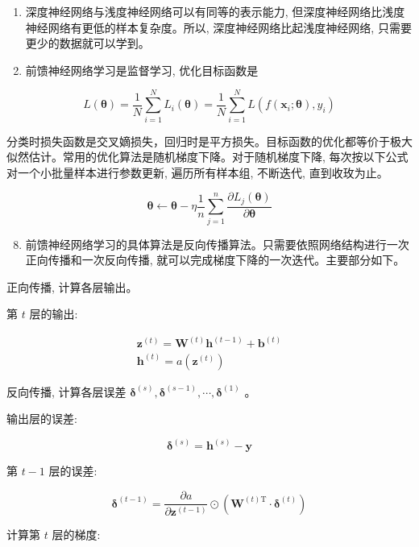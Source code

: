\documentclass[10pt]{article}
\begin{document}
\begin{CJK*}{UTF8}{bsmi}
\begin{enumerate}
  \item 深度神经网络与浅度神经网络可以有同等的表示能力, 但深度神经网络比浅度神经网络有更低的样本复杂度。所以, 深度神经网络比起浅度神经网络, 只需要更少的数据就可以学到。

  \item 前馈神经网络学习是监督学习, 优化目标函数是

\end{enumerate}

$$
L(\boldsymbol{\theta})=\frac{1}{N} \sum_{i=1}^{N} L_{i}(\boldsymbol{\theta})=\frac{1}{N} \sum_{i=1}^{N} L\left(f\left(\boldsymbol{x}_{i} ; \boldsymbol{\theta}\right), y_{i}\right)
$$

分类时损失函数是交叉嫡损失，回归时是平方损失。目标函数的优化都等价于极大似然估计。常用的优化算法是随机梯度下降。对于随机梯度下降, 每次按以下公式对一个小批量样本进行参数更新, 遍历所有样本组, 不断迭代, 直到收玫为止。

$$
\boldsymbol{\theta} \leftarrow \boldsymbol{\theta}-\eta \frac{1}{n} \sum_{j=1}^{n} \frac{\partial L_{j}(\boldsymbol{\theta})}{\partial \boldsymbol{\theta}}
$$

\begin{enumerate}
  \setcounter{enumi}{7}
  \item 前馈神经网络学习的具体算法是反向传播算法。只需要依照网络结构进行一次正向传播和一次反向传播, 就可以完成梯度下降的一次迭代。主要部分如下。
\end{enumerate}

正向传播, 计算各层输出。

第 $t$ 层的输出:

$$
\begin{gathered}
\boldsymbol{z}^{(t)}=\boldsymbol{W}^{(t)} \boldsymbol{h}^{(t-1)}+\boldsymbol{b}^{(t)} \\
\boldsymbol{h}^{(t)}=a\left(\boldsymbol{z}^{(t)}\right)
\end{gathered}
$$

反向传播, 计算各层误差 $\boldsymbol{\delta}^{(s)}, \boldsymbol{\delta}^{(s-1)}, \cdots, \boldsymbol{\delta}^{(1)}$ 。

输出层的误差:

$$
\boldsymbol{\delta}^{(s)}=\boldsymbol{h}^{(s)}-\boldsymbol{y}
$$

第 $t-1$ 层的误差:

$$
\boldsymbol{\delta}^{(t-1)}=\frac{\partial a}{\partial \boldsymbol{z}^{(t-1)}} \odot\left(\boldsymbol{W}^{(t) \mathrm{T}} \cdot \boldsymbol{\delta}^{(t)}\right)
$$

计算第 $t$ 层的梯度:


\end{CJK*}
\end{document}
